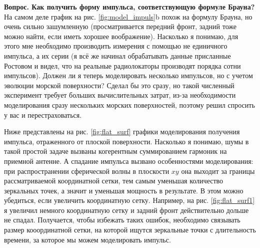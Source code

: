  \textbf{\color{red} \large Вопрос. Как получить форму импульса, соответствующую
 формуле Брауна?}%
 { \color{red}
 На самом деле график на рис. \ref{fig:model_impuls}b похож на формулу Брауна,
 но очень сильно зашумленную (просматривается передний фронт, задний тоже можно
 найти, если иметь хорошее воображение). 
 Насколько я понимаю, для этого мне необходимо производить измерения с помощью
 не единичного импульса, а их серии (я всё же начинал обрабатывать данные
 присланные Ростовом и видел, что на реальные радиолокаторы производят порядка
 сотни импульсов). Должен ли я теперь моделировать несколько импульсов, но с
 учетом эволюции морской поверхности? Сделал бы это сразу, но такой численный
 эксперимент требует больших вычислительных затрат, из-за необходимости
 моделирования сразу нескольких морских поверхностей, поэтому решил спросить у
 вас и перестраховаться.}

 {\color{red} Ниже представлены на рис. \ref{fig:flat_surf} графики моделирования получения импульса, отраженного от
плоской поверхности. Насколько я понимаю, шумы в такой простой задаче вызваны
когерентным суммированием гармоник на приемной антенне. А спадание импульса
вызвано особенностями моделирования: при распространении сферической волны в
плоскости $xy$ она выходит за границы рассматриваемой координатной сетки, тем
самым уменьшая количество зеркальных точек, а значит и уменьшая мощность в
результате. В этом можно убедиться, если увеличить координатную сетку.
Например, на рис. \ref{fig:flat_surf1} я увеличил немного координатную сетку и
задний фронт действительно дольше не спадал. Получается, чтобы избежать таких
ошибок, необходимо связывать размер кооординатной сетки, на которой ищутся
зеркальные точки с длительность времени, за которое мы можем моделировать
импульс.}




